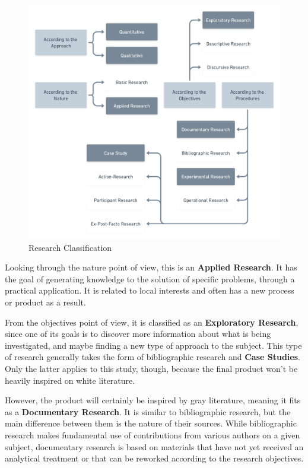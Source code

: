 \begin{figure}[htb]
  \caption{Research Classification}\label{fig:research-classification}
  \begin{center}
    \includegraphics[width=16cm]{img/Research Classification@2x.png}
  \end{center}
\end{figure}

Looking through the nature point of view, this is an \textbf{Applied Research}. It has the goal of generating knowledge to the solution of specific problems, through a practical application. It is related to local interests and often has a new process or product as a result.

From the objectives point of view, it is classified as an \textbf{Exploratory Research}, since one of its goals is to discover more information about what is being investigated, and maybe finding a new type of approach to the subject. This type of research generally takes the form of bibliographic research and \textbf{Case Studies}. Only the latter applies to this study, though, because the final product won't be heavily inspired on white literature.

However, the product will certainly be inspired by gray literature, meaning it fits as a \textbf{Documentary Research}. It is similar to bibliographic research, but the main difference between them is the nature of their sources. While bibliographic research makes fundamental use of contributions from various authors on a given subject, documentary research is based on materials that have not yet received an analytical treatment or that can be reworked according to the research objectives.


